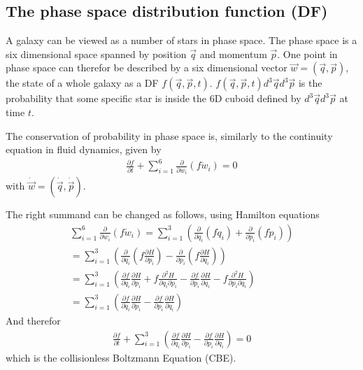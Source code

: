 \documentclass[letterpaper,10pt,english]{sphinxmanual}
\begin{document}
\subsection{The phase space distribution function (DF)}
\label{\detokenize{NBodySimulation/Initialization:the-phase-space-distribution-function-df}}
\sphinxAtStartPar
A galaxy can be viewed as a number of stars in phase space.
The phase space is a six dimensional space spanned by position \(\vec{q}\) and momentum \(\vec{p}\).
One point in phase space can therefor be described by a six dimensional vector \(\vec{w}=(\vec{q},\vec{p})\),
the state of a whole galaxy as a DF \(f(\vec{q},\vec{p},t)\).
\(f(\vec{q},\vec{p},t)d^3\vec{q}d^3\vec{p}\) is the probability that some specific star is inside the 6D cuboid defined by \(d^3\vec{q}d^3\vec{p}\) at time \(t\).

\sphinxAtStartPar
The conservation of probability in phase space is, similarly to the continuity equation in fluid dynamics, given by
\begin{equation*}
\begin{split}\frac{\partial f }{\partial t} + \sum_{i=1}^{6} \frac{\partial}{\partial w_i}(f\dot{w}_i) = 0\end{split}
\end{equation*}
\sphinxAtStartPar
with \(\dot{\vec{w}} = (\dot{\vec{q}},\dot{\vec{p}})\).

\sphinxAtStartPar
The right summand can be changed as follows, using Hamilton equations
\begin{equation*}
\begin{split}\sum_{i=1}^{6} \frac{\partial}{\partial w_i}(f\dot{w}_i)
= \sum_{i=1}^{3} \left ( \frac{\partial}{\partial q_i}\left(f \dot{q}_i\right) + \frac{\partial}{\partial p_i}\left(f\dot{p}_i\right) \right ) \\
= \sum_{i=1}^{3} \left ( \frac{\partial}{\partial q_i}\left(f \frac{\partial H}{\partial p_i}\right) - \frac{\partial}{\partial p_i}\left(f \frac{\partial H}{\partial q_i} \right) \right) \\
= \sum_{i=1}^{3} \left (
\frac{\partial f}{\partial q_i} \frac{\partial H}{\partial p_i}
+ f  \frac{\partial^2 H}{\partial q_i \partial p_i}
- \frac{\partial f}{\partial p_i}  \frac{\partial H}{\partial q_i}
- f \frac{\partial ^2 H}{\partial p_i \partial q_i} \right)  \\
= \sum_{i=1}^{3} \left (
\frac{\partial f}{\partial q_i} \frac{\partial H}{\partial p_i}
- \frac{\partial f}{\partial p_i}  \frac{\partial H}{\partial q_i} \right)\end{split}
\end{equation*}
\sphinxAtStartPar
And therefor
\begin{equation}\label{equation:NBodySimulation/Initialization:collisionless_boltzmann_equation}
\begin{split}\frac{\partial f }{\partial t} + \sum_{i=1}^{3} \left (
 \frac{\partial f}{\partial q_i} \frac{\partial H}{\partial p_i}
 - \frac{\partial f}{\partial p_i}  \frac{\partial H}{\partial q_i} \right) = 0\end{split}
\end{equation}
\sphinxAtStartPar
which is the collisionless Boltzmann Equation (CBE).
\end{document}
